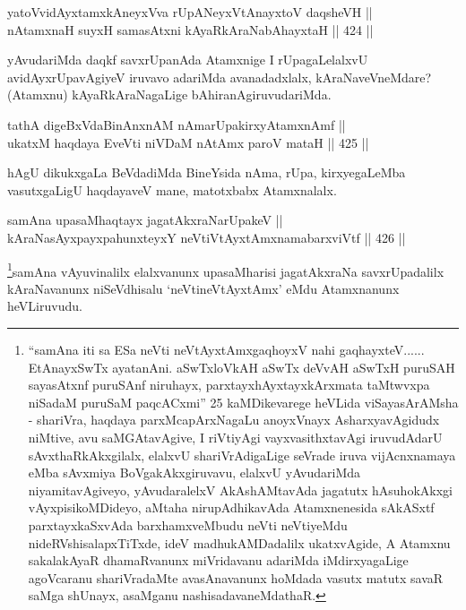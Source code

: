 \begin{shl}
yatoV\s vidAyxtamxkAneyxVva rUpANeyxVtAnayxtoV daqsheVH || \\
nA\s \s tamxnaH suyxH samasAtxni kAyaRkAraNabAhayxtaH \hfill || 424 || 
\end{shl}

\begin{artha}
yAvudariMda daqkf savxrUpanAda Atamxnige I rUpagaLelalxvU
avidAyxrUpavAgiyeV iruvavo adariMda avanadadxlalx, kAraNaveVneMdare?
(Atamxnu) kAyaRkAraNagaLige bAhiranAgiruvudariMda.
\end{artha}


\begin{shl}
\footnotemark[1]tathA digeBxVdaBinAnxnAM nAmarUpakirxyAtamxnAmf || \\
ukatxM haqdaya EveVti niVDaM nA\s \s tAmx paroV mataH \hfill || 425 ||  
\end{shl}

\begin{artha}
hAgU dikukxgaLa BeVdadiMda BineYsida nAma, rUpa,
kirxyegaLeMba vasutxgaLigU haqdayaveV mane, matotxbabx Atamxnalalx.
\end{artha}


\begin{shl}
samAna upasaMhaqtayx jagatAkxraNarUpakeV || \\
kAraNasAyxpayxpahunxteyxY neVtiVtAyxtAmxnamabarxviVtf \hfill || 426 ||  
\end{shl}

\begin{artha}
\footnote{``samAna iti sa ESa neVti neVtAyxtAmxgaqhoyxV nahi gaqhayxteV...... EtAnayxSwTx ayatanAni. aSwTxloVkAH aSwTx deVvAH aSwTxH puruSAH sayasAtxnf puruSAnf niruhayx, parxtayxhAyxtayxkArxmata taMtwvxpa niSadaM puruSaM paqcACxmi'' 25 kaMDikevarege heVLida viSayasArAMsha - shariVra, haqdaya parxMcapArxNagaLu anoyxVnayx AsharxyavAgidudx niMtive, avu saMGAtavAgive, I riVtiyAgi vayxvasithxtavAgi iruvudAdarU sAvxthaRkAkxgilalx, elalxvU shariVrAdigaLige seVrade iruva vijAcnxnamaya eMba sAvxmiya BoVgakAkxgiruvavu, elalxvU yAvudariMda niyamitavAgiveyo, yAvudaralelxV AkAshAMtavAda jagatutx hAsuhokAkxgi vAyxpisikoMDideyo, aMtaha nirupAdhikavAda Atamxnenesida sAkASxtf parxtayxkaSxvAda barxhamxveMbudu neVti neVtiyeMdu nideRVshisalapxTiTxde, ideV madhukAMDadalilx ukatxvAgide, A Atamxnu sakalakAyaR dhamaRvanunx miVridavanu adariMda iMdirxyagaLige agoVcaranu shariVradaMte avasAnavanunx hoMdada vasutx matutx savaR saMga shUnayx, asaMganu nashisadavaneMdathaR.}samAna vAyuvinalilx elalxvanunx upasaMharisi jagatAkxraNa savxrUpadalilx kAraNavanunx niSeVdhisalu `neVtineVtAyxtAmx' eMdu Atamxnanunx heVLiruvudu.
\end{artha}

